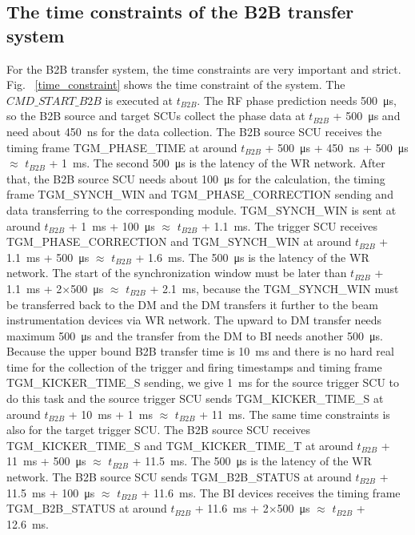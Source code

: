\subsection{The time constraints of the B2B transfer system}
For the B2B transfer system, the time constraints are very important and strict. Fig. ~\ref{time_constraint} shows the time constraint of the system. The $CMD\_START\_B2B$ is executed at $t_{B2B}$. The RF phase prediction needs \SI{500}{\us}, so the B2B source and target SCUs collect the phase data at $t_{B2B}$ + \SI{500}{\us} and need about \SI{450}{\ns} for the data collection. The B2B source SCU receives the timing frame TGM\_PHASE\_TIME at around $t_{B2B}$ + \SI{500}{\us} + \SI{450}{\ns} + \SI{500}{\us} $\approx$ $t_{B2B}$ + \SI{1}{\ms}. The second \SI{500}{\us} is the latency of the WR network. After that, the B2B source SCU needs about \SI{100}{\us} for the calculation, the timing frame TGM\_SYNCH\_WIN and TGM\_PHASE\_CORRECTION sending and data transferring to the corresponding module. TGM\_SYNCH\_WIN is sent at around $t_{B2B}$ + \SI{1}{\ms} + \SI{100}{\us} $\approx$ $t_{B2B}$ + \SI{1.1}{\ms}. The trigger SCU receives TGM\_PHASE\_CORRECTION and TGM\_SYNCH\_WIN at around $t_{B2B}$ + \SI{1.1}{\ms} + \SI{500}{\us} $\approx$ $t_{B2B}$ + \SI{1.6}{\ms}. The \SI{500}{\us} is the latency of the WR network. The start of the synchronization window must be later than $t_{B2B}$ + \SI{1.1}{\ms} + 2$\times$\SI{500}{\us} $\approx$ $t_{B2B}$ + \SI{2.1}{\ms}, because the TGM\_SYNCH\_WIN must be transferred back to the DM and the DM transfers it further to the beam instrumentation devices via WR network. The upward to DM transfer needs maximum \SI{500}{\us} and the transfer from the DM to BI needs another \SI{500}{\us}.  Because the upper bound B2B transfer time is \SI{10}{\ms} and there is no hard real time for the collection of the trigger and firing timestamps and timing frame TGM\_KICKER\_TIME\_S sending, we give \SI{1}{\ms} for the source trigger SCU to do this task and the source trigger SCU sends TGM\_KICKER\_TIME\_S at around $t_{B2B}$ + \SI{10}{\ms} + \SI{1}{\ms} $\approx$ $t_{B2B}$ + \SI{11}{\ms}. The same time constraints is also for the target trigger SCU. The B2B source SCU receives TGM\_KICKER\_TIME\_S and TGM\_KICKER\_TIME\_T at around $t_{B2B}$ + \SI{11}{\ms} + \SI{500}{\us} $\approx$ $t_{B2B}$ + \SI{11.5}{\ms}. The \SI{500}{\us} is the latency of the WR network. The B2B source SCU sends TGM\_B2B\_STATUS at around $t_{B2B}$ + \SI{11.5}{\ms} + \SI{100}{\us} $\approx$ $t_{B2B}$ + \SI{11.6}{\ms}. The BI devices receives the timing frame TGM\_B2B\_STATUS at around $t_{B2B}$ + \SI{11.6}{\ms} + 2$\times$\SI{500}{\us} $\approx$ $t_{B2B}$ + \SI{12.6}{\ms}.

